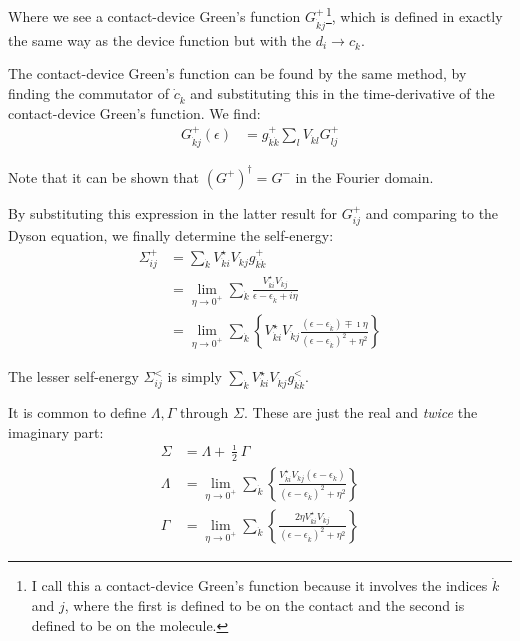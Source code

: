 Where we see a contact-device Green's function $G_{\dot{k}j}^+$\footnote{I call this a contact-device Green's function because it involves the indices $\dot{k}$ and $j$, where the first is defined to be on the contact and the second is defined to be on the molecule.}, which is defined in exactly the same way as the device function but with the $d_i \rightarrow c_{\dot{k}}$.

The contact-device Green's function can be found by the same method, by finding the commutator of $\dot{c}_{\dot{k}}$ and substituting this in the time-derivative of the contact-device Green's function. We find:
\begin{align*}
G_{\dot{k}j}^+ (\epsilon) &= g_{\dot{k}\dot{k}}^+ \sum_l V_{\dot{k}l} G_{lj}^+
\end{align*}

Note that it can be shown that $(G^+)^\dagger=G^-$ in the Fourier domain.

By substituting this expression in the latter result for $G_{ij}^+$ and comparing to the Dyson equation, we finally determine the self-energy:
\begin{align*}
\Sigma_{ij}^+ &= \sum_{\dot{k}} V_{\dot{k}i}^\star V_{\dot{k}j} g_{\dot{k}\dot{k}}^+ \\
&= \lim_{\eta\rightarrow 0^+} \sum_{\dot{k}}\frac{ V_{\dot{k}i}^\star V_{\dot{k}j}}{\epsilon-\epsilon_{\dot{k}} + i\eta} \\
&= \lim_{\eta\rightarrow 0^+}\sum_{\dot{k}} \left\{V_{\dot{k}i}^\star V_{\dot{k}j} \frac{ \left(\epsilon-\epsilon_{\dot{k}}\right) \mp \imath \eta}{  \left(\epsilon-\epsilon_{\dot{k}}\right)^2 + \eta^2}\right\}
\end{align*} 

The lesser self-energy $\Sigma^<_{ij}$ is simply $\sum_{\dot{k}} V_{\dot{k}i}^\star V_{\dot{k}j} g_{\dot{k}\dot{k}}^<$.

It is common to define  $\Lambda, \Gamma$ through $\Sigma$. These are just the real and \emph{twice} the imaginary part:
\begin{align*}
\Sigma &= \Lambda + \frac{\imath}{2} \Gamma \\
\Lambda &=  \lim_{\eta\rightarrow 0^+}\sum_{\dot{k}} \left\{ \frac{V_{\dot{k}i}^\star V_{\dot{k}j} \left(\epsilon-\epsilon_{\dot{k}}\right)}{  \left(\epsilon-\epsilon_{\dot{k}}\right)^2 + \eta^2}\right\} \\
\Gamma &= 
\lim_{\eta\rightarrow 0^+}\sum_{\dot{k}} \left\{ \frac{2 \eta V_{\dot{k}i}^\star V_{\dot{k}j}}{  \left(\epsilon-\epsilon_{\dot{k}}\right)^2 + \eta^2}\right\}
\end{align*}

